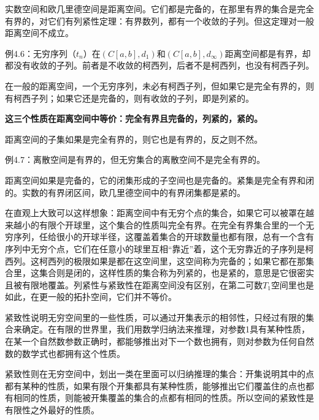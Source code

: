 实数空间和欧几里德空间是距离空间。它们都是完备的，在那里有界的集合是完全有界的，对它们有列紧性定理：有界数列，都有一个收敛的子列。但这定理对一般距离空间不成立。

\kaishu
\setlength{\leftskip}{1em}

例4.6：无穷序列（$ t_n $）在$ (C[a,b],d_1) $和$ (C[a,b],d_\infty) $距离空间都是有界，却都没有收敛的子列。前者是不收敛的柯西列，后者不是柯西列，也没有柯西子列。

\songti
\setlength{\leftskip}{0em}

在一般的距离空间，一个无穷序列，未必有柯西子列，但如果它是完全有界的，则有柯西子列；如果它还是完备的，则有收敛的子列，即是列紧的。

\kaishu

\textbf{这三个性质在距离空间中等价：完全有界且完备的，列紧的，紧的。}

\songti

距离空间的子集如果是完全有界的，则它也是有界的，反之则不然。

\kaishu
\setlength{\leftskip}{1em}

例4.7：离散空间是有界的，但无穷集合的离散空间不是完全有界的。

\songti
\setlength{\leftskip}{0em}

距离空间如果是完备的，它的闭集形成的子空间也是完备的。紧集是完全有界和闭的。实数的有界闭区间，欧几里德空间中的有界闭集都是紧的。

在直观上大致可以这样想象：距离空间中有无穷个点的集合，如果它可以被罩在越来越小的有限个开球里，这个集合的性质叫完全有界。在完全有界集合里的一个无穷序列，任给很小的开球半径，这覆盖着集合的开球数量也都有限，总有一个含有序列中无穷个点，它们在任意小的球里互相“靠近”着，这个无穷靠近的子序列是柯西列。这柯西列的极限如果是都在这空间里，这空间称为完备的；如果它都在那集合里，这集合则是闭的，这样性质的集合称为列紧的，也是紧的，意思是它很密实且被有限地覆盖。列紧性与紧致性在距离空间没有区别，在第二可数$ T_1 $空间里也是如此，在更一般的拓扑空间，它们并不等价。

紧致性说明无穷空间里的一些性质，可以通过开集表示的相邻性，只经过有限的集合来确定。在有限的世界里，我们用数学归纳法来推理，对参数1具有某种性质，在某一个自然数参数正确时，都能够推出对下一个数也拥有，则对参数为任何自然数的数学式也都拥有这个性质。

紧致性则在无穷空间中，划出一类在里面可以归纳推理的集合：开集说明其中的点都有某种的性质，如果有限个开集都具有某种性质，能够推出它们覆盖住的点也都有相同的性质，则能被开集覆盖的集合的点都有相同的性质。所以空间的紧致性是有限性之外最好的性质。

